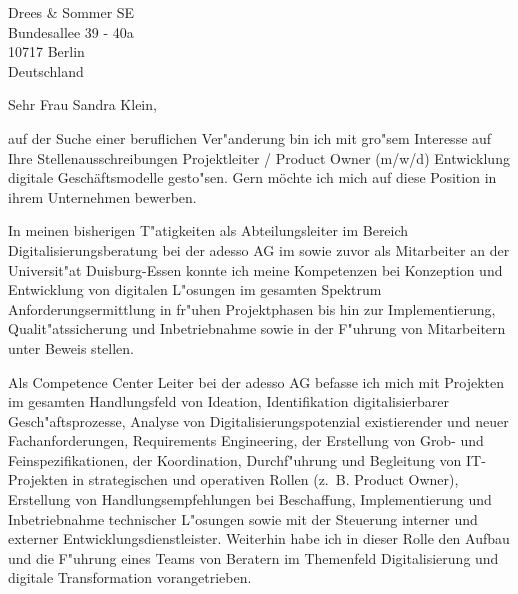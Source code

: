 \documentclass[10pt,a4paper]{dinbrief}
\date{\today}
\begin{document}
 
\begin{letter}  
{%
	Drees \& Sommer SE\\
	Bundesallee 39 - 40a\\
	10717 Berlin\\
	Deutschland
}
\subject{\bf Bewerbung Projektleiter / Product Owner (m/w/d) Entwicklung digitale Geschäftsmodelle}
\opening{Sehr Frau Sandra Klein,}
auf der Suche einer beruflichen Ver"anderung bin ich mit gro"sem Interesse auf Ihre Stellenausschreibungen Projektleiter / Product Owner (m/w/d) Entwicklung digitale Geschäftsmodelle gesto"sen. Gern möchte ich mich auf diese Position in ihrem Unternehmen bewerben. 

In meinen bisherigen T"atigkeiten als Abteilungsleiter im Bereich Digitalisierungsberatung bei der adesso AG im sowie zuvor als Mitarbeiter an der Universit"at Duisburg-Essen konnte ich meine Kompetenzen bei Konzeption und Entwicklung von digitalen L"osungen im gesamten Spektrum Anforderungsermittlung in fr"uhen Projektphasen bis hin zur Implementierung, Qualit"atssicherung und Inbetriebnahme sowie in der F"uhrung von Mitarbeitern  unter Beweis stellen.


Als Competence Center Leiter bei der adesso AG befasse ich mich mit Projekten im gesamten Handlungsfeld von Ideation, Identifikation digitalisierbarer Gesch"aftsprozesse, Analyse von Digitalisierungspotenzial existierender und neuer Fachanforderungen, Requirements Engineering, der Erstellung von Grob- und Feinspezifikationen, der Koordination, Durchf"uhrung und Begleitung von IT-Projekten in strategischen und operativen Rollen (z.~B. Product Owner), Erstellung von Handlungsempfehlungen bei Beschaffung, Implementierung und Inbetriebnahme technischer L"osungen sowie mit der Steuerung interner und externer Entwicklungsdienstleister. Weiterhin habe ich in dieser Rolle den Aufbau und die F"uhrung eines Teams von Beratern im Themenfeld Digitalisierung und digitale Transformation vorangetrieben. 


\end{letter}
\end{document}
